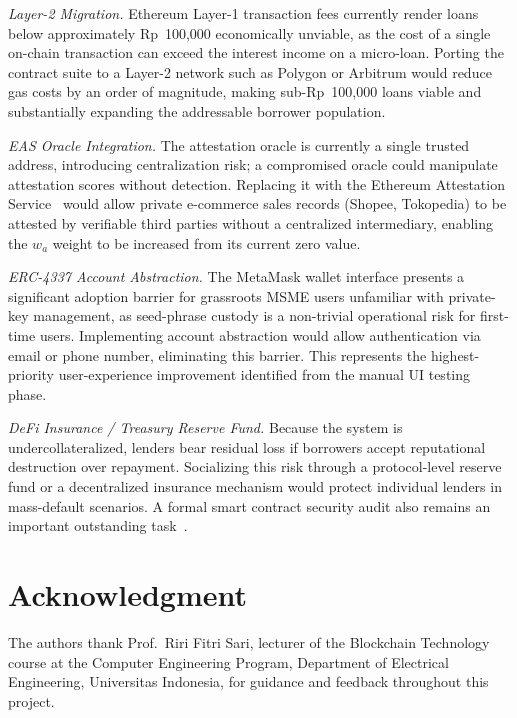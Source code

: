 \documentclass[conference]{IEEEtran}
\begin{document}
\textit{Layer-2 Migration.} Ethereum Layer-1 transaction fees currently
render loans below approximately Rp~100,000 economically unviable, as the
cost of a single on-chain transaction can exceed the interest income on a
micro-loan. Porting the contract suite to a Layer-2 network such as
Polygon or Arbitrum would reduce gas costs by an order of magnitude,
making sub-Rp~100,000 loans viable and substantially expanding the
addressable borrower population.

\textit{EAS Oracle Integration.} The attestation oracle is currently a
single trusted address, introducing centralization risk; a compromised
oracle could manipulate attestation scores without detection. Replacing it
with the Ethereum Attestation Service~\cite{b6} would allow private
e-commerce sales records (Shopee, Tokopedia) to be attested by verifiable
third parties without a centralized intermediary, enabling the $w_a$ weight
to be increased from its current zero value.

\textit{ERC-4337 Account Abstraction.} The MetaMask wallet interface
presents a significant adoption barrier for grassroots MSME users unfamiliar
with private-key management, as seed-phrase custody is a non-trivial
operational risk for first-time users. Implementing account abstraction would
allow authentication via email or phone number, eliminating this barrier.
This represents the highest-priority user-experience improvement identified
from the manual UI testing phase.

\textit{DeFi Insurance / Treasury Reserve Fund.} Because the system is
undercollateralized, lenders bear residual loss if borrowers accept
reputational destruction over repayment. Socializing this risk through
a protocol-level reserve fund or a decentralized insurance mechanism
would protect individual lenders in mass-default scenarios. A formal
smart contract security audit also remains an important outstanding task~\cite{b25}.

\section*{Acknowledgment}

The authors thank Prof.\ Riri Fitri Sari, lecturer of the Blockchain Technology
course at the Computer Engineering Program, Department of Electrical Engineering,
Universitas Indonesia, for guidance and feedback throughout this project.
\end{document}
